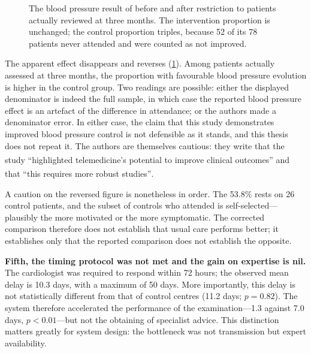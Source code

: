 \documentclass[12pt,a4paper,oneside]{report}
\newcommand{\bq}[1]{``#1''\textsuperscript{\dag}}
\begin{document}
\begin{figure}[htbp]
\centering
{}
\caption{The blood pressure result of \textcite{bediang2021} before and after restriction to patients actually reviewed at three months. The intervention proportion is unchanged; the control proportion triples, because 52 of its 78 patients never attended and were counted as not improved.}\label{fig:bediang-attrition}
\end{figure}

The apparent effect disappears and reverses (\cref{fig:bediang-attrition}). Among patients actually assessed at three months, the proportion with favourable blood pressure evolution is higher in the control group. Two readings are possible: either the displayed denominator is indeed the full sample, in which case the reported blood pressure effect is an artefact of the difference in attendance; or the authors made a denominator error. In either case, the claim that this study demonstrates improved blood pressure control is not defensible as it stands, and this thesis does not repeat it. The authors are themselves cautious: they write that the study \bq{highlighted telemedicine's potential to improve clinical outcomes} and that \bq{this requires more robust studies}.

A caution on the reversed figure is nonetheless in order. The 53.8\% rests on 26 control patients, and the subset of controls who attended is self-selected---plausibly the more motivated or the more symptomatic. The corrected comparison therefore does not establish that usual care performs better; it establishes only that the reported comparison does not establish the opposite.

\textbf{Fifth, the timing protocol was not met and the gain on expertise is nil.} The cardiologist was required to respond within 72 hours; the observed mean delay is 10.3 days, with a maximum of 50 days. More importantly, this delay is not statistically different from that of control centres (11.2 days; $p = 0.82$). The system therefore accelerated the performance of the examination---1.3 against 7.0 days, $p < 0.01$---but not the obtaining of specialist advice. This distinction matters greatly for system design: the bottleneck was not transmission but expert availability.
\end{document}
